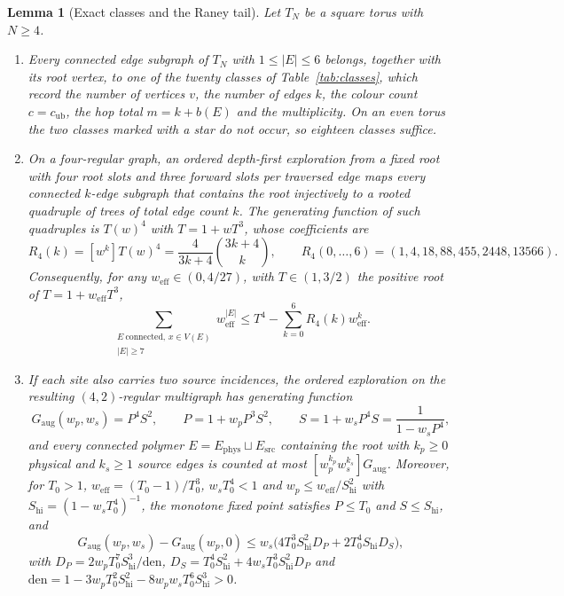 \documentclass[11pt]{article}
\theoremstyle{plain}
\newtheorem{lemma}{Lemma}
\theoremstyle{definition}
\begin{document}
\begin{lemma}[Exact classes and the Raney tail]\label{lem:counting}
Let $T_N$ be a square torus with $N\ge4$.
\begin{enumerate}
\item\label{it:exact} Every connected edge subgraph of $T_N$ with $1\le|E|\le6$
belongs, together with its root vertex, to one of the twenty classes of
Table~\ref{tab:classes}, which record the number of vertices $v$, the number of edges
$k$, the colour count $c=c_{\mathrm{ub}}$, the hop total $m=k+b(E)$ and the
multiplicity. On an even torus the two classes marked with a star do not occur, so
eighteen classes suffice.
\item\label{it:tail} On a four-regular graph, an ordered depth-first exploration from
a fixed root with four root slots and three forward slots per traversed edge maps
every connected $k$-edge subgraph that contains the root injectively to a rooted
quadruple of trees of total edge count $k$. The generating function of such
quadruples is $T(w)^{4}$ with $T=1+wT^{3}$, whose coefficients are
\begin{equation}\label{eq:raney}
R_4(k)=[w^{k}]T(w)^{4}=\frac{4}{3k+4}\binom{3k+4}{k},\qquad
R_4(0,\dots,6)=(1,4,18,88,455,2448,13566).
\end{equation}
Consequently, for any $w_{\mathrm{eff}}\in(0,4/27)$, with $T\in(1,3/2)$ the positive
root of $T=1+w_{\mathrm{eff}}T^{3}$,
\[
\sum_{\substack{E\ \text{connected},\,x\in V(E)\\ |E|\ge7}}
w_{\mathrm{eff}}^{|E|}\le T^{4}-\sum_{k=0}^{6}R_4(k)w_{\mathrm{eff}}^{k}.
\]
\item\label{it:twovar} If each site also carries two source incidences, the ordered
exploration on the resulting $(4,2)$-regular multigraph has generating function
\begin{equation}\label{eq:twovar}
G_{\mathrm{aug}}(w_p,w_s)=P^{4}S^{2},\qquad
P=1+w_pP^{3}S^{2},\qquad S=1+w_sP^{4}S=\frac{1}{1-w_sP^{4}},
\end{equation}
and every connected polymer $E=E_{\mathrm{phys}}\sqcup E_{\mathrm{src}}$ containing
the root with $k_p\ge0$ physical and $k_s\ge1$ source edges is counted at most
$[w_p^{k_p}w_s^{k_s}]G_{\mathrm{aug}}$. Moreover, for $T_0>1$,
$w_{\mathrm{eff}}=(T_0-1)/T_0^{3}$, $w_sT_0^{4}<1$ and
$w_p\le w_{\mathrm{eff}}/S_{\mathrm{hi}}^{2}$ with
$S_{\mathrm{hi}}=(1-w_sT_0^{4})^{-1}$, the monotone fixed point satisfies
$P\le T_0$ and $S\le S_{\mathrm{hi}}$, and
\begin{equation}\label{eq:twobound}
G_{\mathrm{aug}}(w_p,w_s)-G_{\mathrm{aug}}(w_p,0)
\le w_s\bigl(4T_0^{3}S_{\mathrm{hi}}^{2}D_P+2T_0^{4}S_{\mathrm{hi}}D_S\bigr),
\end{equation}
with $D_P=2w_pT_0^{7}S_{\mathrm{hi}}^{3}/\mathrm{den}$,
$D_S=T_0^{4}S_{\mathrm{hi}}^{2}+4w_sT_0^{3}S_{\mathrm{hi}}^{2}D_P$ and
$\mathrm{den}=1-3w_pT_0^{2}S_{\mathrm{hi}}^{2}-8w_pw_sT_0^{6}S_{\mathrm{hi}}^{3}>0$.
\end{enumerate}
\end{lemma}
\end{document}
